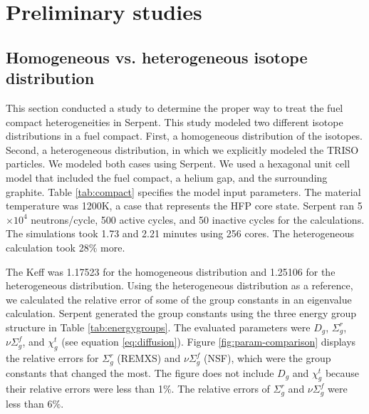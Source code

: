 \section{Preliminary studies}

\subsection{Homogeneous vs. heterogeneous isotope distribution}

This section conducted a study to determine the proper way to treat the fuel compact heterogeneities in Serpent.
This study modeled two different isotope distributions in a fuel compact.
First, a homogeneous distribution of the isotopes.
Second, a heterogeneous distribution, in which we explicitly modeled the TRISO particles.
We modeled both cases using Serpent.
We used a hexagonal unit cell model that included the fuel compact, a helium gap, and the surrounding graphite.
Table \ref{tab:compact} specifies the model input parameters.
The material temperature was 1200K, a case that represents the \gls{HFP} core state.
Serpent ran 5$\times 10^4$ neutrons/cycle, 500 active cycles, and 50 inactive cycles for the calculations.
The simulations took 1.73 and 2.21 minutes using 256 cores.
The heterogeneous calculation took 28$\%$ more.

The \gls{Keff} was 1.17523 for the homogeneous distribution and 1.25106 for the heterogeneous distribution.
Using the heterogeneous distribution as a reference, we calculated the relative error of some of the group constants in an eigenvalue calculation.
Serpent generated the group constants using the three energy group structure in Table \ref{tab:energygroups}.
The evaluated parameters were $D_g$, $\Sigma^r_g$, $\nu\Sigma^f_g$, and $\chi^t_g$ (see equation \ref{eq:diffusion}).
Figure \ref{fig:param-comparison} displays the relative errors for $\Sigma^r_g$ (REMXS) and $\nu\Sigma^f_g$ (NSF), which were the group constants that changed the most.
The figure does not include $D_g$ and $\chi^t_g$ because their relative errors were less than 1$\%$.
The relative errors of $\Sigma^r_g$ and $\nu\Sigma^f_g$ were less than 6$\%$.


